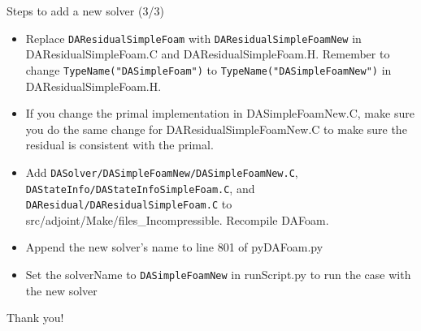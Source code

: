 \documentclass{bredelebeamer}
\begin{document}
\begin{frame}[fragile]{Steps to add a new solver (3/3)}
\begin{itemize}
  \setlength\itemsep{0.5em}
  \item Replace \texttt{DAResidualSimpleFoam} with \texttt{DAResidualSimpleFoamNew} in DAResidualSimpleFoam.C and DAResidualSimpleFoam.H. Remember to change \texttt{TypeName("DASimpleFoam")} to \texttt{TypeName("DASimpleFoamNew")} in DAResidualSimpleFoam.H.
 \item If you change the primal implementation in DASimpleFoamNew.C, make sure you do the same change for DAResidualSimpleFoamNew.C to make sure the residual is consistent with the primal.
 \item Add \texttt{DASolver/DASimpleFoamNew/DASimpleFoamNew.C}, \texttt{DAStateInfo/DAStateInfoSimpleFoam.C}, and \texttt{DAResidual/DAResidualSimpleFoam.C} to src/adjoint/Make/files\_Incompressible. Recompile DAFoam.
 \item Append the new solver's name to line 801 of pyDAFoam.py
 \item Set the solverName to \texttt{DASimpleFoamNew} in runScript.py to run the case with the new solver
\end{itemize}
\end{frame}

\begin{frame}[plain]{}
  \Huge \centering
  Thank you!
\end{frame}
\end{document}
